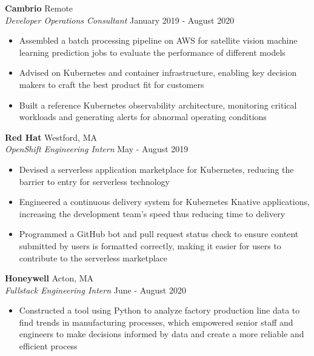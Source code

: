 \documentclass[10pt]{article}
\begin{document}
\begin{flushleft}
	\textbf{Cambrio} \hfill Remote \\
	\textit{Developer Operations Consultant} \hfill January 2019 - August 2020  \\
	\begin{itemize}
		\item Assembled a batch processing pipeline on AWS for satellite vision machine learning prediction jobs to evaluate the performance of different models

		\item Advised on Kubernetes and container infrastructure, enabling key decision makers to craft the best product fit for customers

		\item Built a reference Kubernetes observability architecture, monitoring critical workloads and generating alerts for abnormal operating conditions
	\end{itemize}

	 \textbf{Red Hat} \hfill Westford, MA \\
	 \textit{OpenShift Engineering Intern} \hfill May - August 2019 \\
	 \begin{itemize}
		 \item Devised a serverless application marketplace for Kubernetes, reducing the barrier to entry for serverless technology
		 
		 \item Engineered a continuous delivery system for Kubernetes Knative applications, increasing the development team's speed thus reducing time to delivery
 
		 \item Programmed a GitHub bot and pull request status check to ensure content submitted by users is formatted correctly, making it easier for users to contribute to the serverless marketplace
	 \end{itemize}

	\textbf{Honeywell} \hfill Acton, MA \\
	\textit{Fullstack Engineering Intern} \hfill June - August 2020 \\
    \begin{itemize}
        \item Constructed a tool using Python to analyze factory production line data to find trends in manufacturing processes, which empowered senior staff and engineers to make decisions informed by data and create a more reliable and efficient process


\end{itemize}
\end{flushleft}
\end{document}
